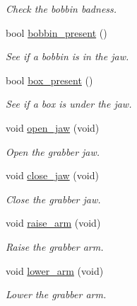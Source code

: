 \begin{DoxyCompactItemize}
\begin{DoxyCompactList}\small\item\em Check the bobbin badness. \item\end{DoxyCompactList}\item 
bool \hyperlink{classIDP_1_1ClampControl_acc9ea5549b9eaeb9c53fb8e1b7dd0a7d}{bobbin\_\-present} ()
\begin{DoxyCompactList}\small\item\em See if a bobbin is in the jaw. \item\end{DoxyCompactList}\item 
bool \hyperlink{classIDP_1_1ClampControl_a1731e2025ab33c430d3e4bf1a941ce23}{box\_\-present} ()
\begin{DoxyCompactList}\small\item\em See if a box is under the jaw. \item\end{DoxyCompactList}\item 
void \hyperlink{classIDP_1_1ClampControl_a5b67a46af3f8682b81cbf68f8693247e}{open\_\-jaw} (void)
\begin{DoxyCompactList}\small\item\em Open the grabber jaw. \item\end{DoxyCompactList}\item 
void \hyperlink{classIDP_1_1ClampControl_a94364f9779f57df6e63f44968fc5c163}{close\_\-jaw} (void)
\begin{DoxyCompactList}\small\item\em Close the grabber jaw. \item\end{DoxyCompactList}\item 
void \hyperlink{classIDP_1_1ClampControl_a64f742aca4caf9797ef45ee40938cab3}{raise\_\-arm} (void)
\begin{DoxyCompactList}\small\item\em Raise the grabber arm. \item\end{DoxyCompactList}\item 
void \hyperlink{classIDP_1_1ClampControl_a011866d438336ee003774eccf7c207e0}{lower\_\-arm} (void)
\begin{DoxyCompactList}\small\item\em Lower the grabber arm. \item\end{DoxyCompactList}\item 

\end{DoxyCompactItemize}
